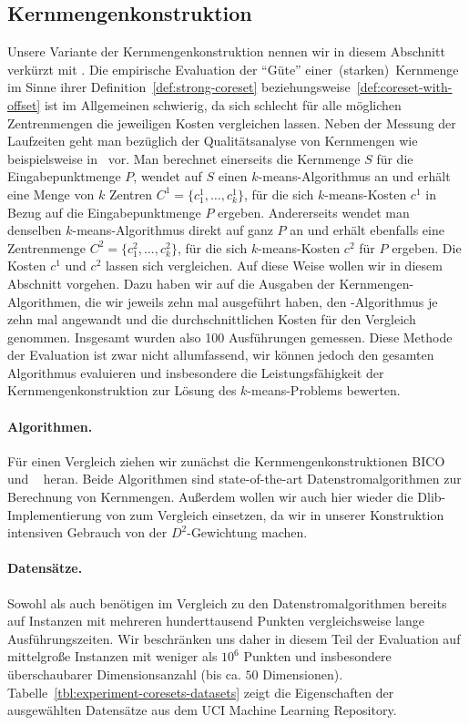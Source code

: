 \subsection{Kernmengenkonstruktion}
\label{subsection:experiment-coreset}

Unsere Variante der Kernmengenkonstruktion nennen wir in diesem Abschnitt verkürzt mit \CsTwo. Die empirische Evaluation
der "`Güte"' einer~(starken)~Kernmenge im Sinne ihrer Definition~\ref{def:strong-coreset}
beziehungsweise~\ref{def:coreset-with-offset} ist im Allgemeinen schwierig, da sich schlecht für alle möglichen Zentrenmengen
die jeweiligen Kosten vergleichen lassen. Neben der Messung der Laufzeiten geht man bezüglich der Qualitätsanalyse von Kernmengen
wie beispielsweise in~\cite{AckermannMRSLS12,FichtenbergerGSSS13} vor. Man berechnet einerseits die Kernmenge $S$ für die
Eingabepunktmenge $P$, wendet auf $S$ einen $k$-means-Algorithmus an und erhält eine Menge von $k$ Zentren
$C^1 = \{c_1^1, \dots, c_k^1\}$, für die sich $k$-means-Kosten $c^1$ in Bezug auf die Eingabepunktmenge $P$ ergeben.
Andererseits wendet man denselben $k$-means-Algorithmus direkt auf ganz $P$ an und erhält ebenfalls eine Zentrenmenge
$C^2 = \{c_1^2, \dots, c_k^2\}$, für die sich $k$-means-Kosten $c^2$ für $P$ ergeben. Die Kosten $c^1$ und $c^2$ lassen sich
vergleichen. Auf diese Weise wollen wir in diesem Abschnitt vorgehen. Dazu haben wir auf die Ausgaben der Kernmengen-Algorithmen,
die wir jeweils zehn mal ausgeführt haben,
den \kmpp-Algorithmus je zehn mal angewandt und die durchschnittlichen Kosten für den Vergleich
genommen. Insgesamt wurden also 100 Ausführungen gemessen.
Diese Methode der Evaluation ist zwar nicht allumfassend,
wir können jedoch den gesamten Algorithmus evaluieren und insbesondere die Leistungsfähigkeit der Kernmengenkonstruktion zur
Lösung des $k$-means-Problems bewerten.
\paragraph{Algorithmen.} Für einen Vergleich ziehen wir zunächst die Kernmengenkonstruktionen BICO~\cite{FichtenbergerGSSS13}
und \Skmpp~\cite{AckermannMRSLS12} heran. Beide Algorithmen sind state-of-the-art Datenstromalgorithmen zur Berechnung von
Kernmengen. Außerdem wollen wir auch hier wieder die Dlib-Implementierung von \kmpp{} zum Vergleich einsetzen, da wir in
unserer Konstruktion intensiven Gebrauch von der $D^2$-Gewichtung machen.
\paragraph{Datensätze.} Sowohl \kmpp{} als auch \CsTwo{} benötigen im Vergleich zu den Datenstromalgorithmen bereits auf Instanzen
mit mehreren hunderttausend Punkten vergleichsweise lange Ausführungszeiten. Wir beschränken uns daher in diesem Teil der
Evaluation auf mittelgroße Instanzen mit weniger als $10^6$ Punkten und insbesondere überschaubarer Dimensionsanzahl (bis
ca. $50$ Dimensionen). Tabelle~\ref{tbl:experiment-coresets-datasets} zeigt die Eigenschaften der ausgewählten Datensätze aus dem
UCI Machine Learning Repository.

